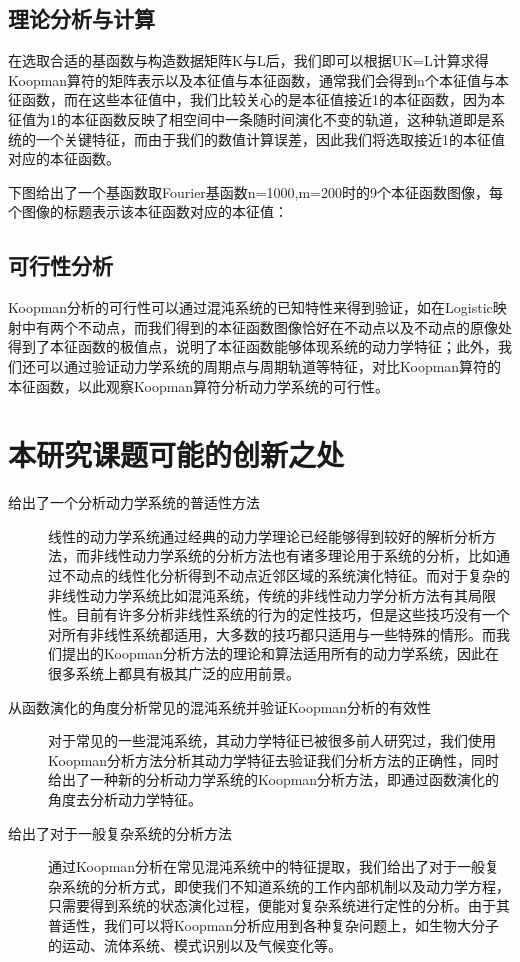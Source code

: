 \subsection{理论分析与计算}
在选取合适的基函数与构造数据矩阵K与L后，我们即可以根据UK=L计算求得Koopman算符的矩阵表示以及本征值与本征函数，通常我们会得到n个本征值与本征函数，而在这些本征值中，我们比较关心的是本征值接近1的本征函数，因为本征值为1的本征函数反映了相空间中一条随时间演化不变的轨道，这种轨道即是系统的一个关键特征，而由于我们的数值计算误差，因此我们将选取接近1的本征值对应的本征函数。

下图给出了一个基函数取Fourier基函数n=1000,m=200时的9个本征函数图像，每个图像的标题表示该本征函数对应的本征值：

\subsection{可行性分析}
Koopman分析的可行性可以通过混沌系统的已知特性来得到验证，如在Logistic映射中有两个不动点，而我们得到的本征函数图像恰好在不动点以及不动点的原像处得到了本征函数的极值点，说明了本征函数能够体现系统的动力学特征；此外，我们还可以通过验证动力学系统的周期点与周期轨道等特征，对比Koopman算符的本征函数，以此观察Koopman算符分析动力学系统的可行性。

\section{本研究课题可能的创新之处}
\begin{description}
    \item[给出了一个分析动力学系统的普适性方法]

    线性的动力学系统通过经典的动力学理论已经能够得到较好的解析分析方法，而非线性动力学系统的分析方法也有诸多理论用于系统的分析，比如通过不动点的线性化分析得到不动点近邻区域的系统演化特征。而对于复杂的非线性动力学系统比如混沌系统，传统的非线性动力学分析方法有其局限性。目前有许多分析非线性系统的行为的定性技巧，但是这些技巧没有一个对所有非线性系统都适用，大多数的技巧都只适用与一些特殊的情形。而我们提出的Koopman分析方法的理论和算法适用所有的动力学系统，因此在很多系统上都具有极其广泛的应用前景。

    \item[从函数演化的角度分析常见的混沌系统并验证Koopman分析的有效性]
     
    对于常见的一些混沌系统，其动力学特征已被很多前人研究过，我们使用Koopman分析方法分析其动力学特征去验证我们分析方法的正确性，同时给出了一种新的分析动力学系统的Koopman分析方法，即通过函数演化的角度去分析动力学特征。

    \item[给出了对于一般复杂系统的分析方法]
     
    通过Koopman分析在常见混沌系统中的特征提取，我们给出了对于一般复杂系统的分析方式，即使我们不知道系统的工作内部机制以及动力学方程，只需要得到系统的状态演化过程，便能对复杂系统进行定性的分析。由于其普适性，我们可以将Koopman分析应用到各种复杂问题上，如生物大分子的运动、流体系统、模式识别以及气候变化等。
 
\end{description}

